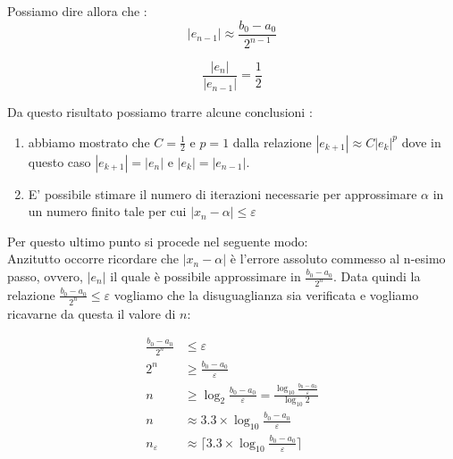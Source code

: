 \documentclass[12pt, a4paper]{book}
\theoremstyle{definition}
\begin{document}
\begin{flushleft}
Possiamo dire allora che : 
\[ 
	|e_{n-1}| \approx \frac{b_{0} - a_{0}}{2^{n-1}} 
\]

\[ 
	\dfrac{|e_{n}| }{|e_{n-1}| } = \frac{1}{2}
\]

Da questo risultato possiamo trarre alcune conclusioni : 
\begin{enumerate}
	\item abbiamo mostrato che $C = \frac{1}{2}$ e $p = 1$ dalla relazione $|e_{k+1}| \approx C|e_{k}|^{p}$ dove in questo caso $|e_{k+1}| = |e_{n}| $ e $|e_{k}| = |e_{n-1}| $.
	\item E' possibile stimare il numero di iterazioni necessarie per approssimare $\alpha$ in un numero finito tale per cui $|x_{n} - \alpha| \leq \varepsilon$
\end{enumerate}

Per questo ultimo punto si procede nel seguente modo:\\
Anzitutto occorre ricordare che $|x_{n} - \alpha|$ è l'errore assoluto commesso al n-esimo passo,  ovvero, $|e_{n}|$ il quale è possibile approssimare in  $ \frac{b_{0} - a_{0}}{2^{n}}$.  Data quindi la relazione $ \frac{b_{0} - a_{0}}{2^{n}} \leq \varepsilon$ vogliamo che la disuguaglianza sia verificata e vogliamo ricavarne da questa il valore di $n$:

\begin{equation}
	\begin{split}
		 \frac{b_{0} - a_{0}}{2^{n}} & \leq \varepsilon \\
		 2^{n} & \geq  \frac{b_{0} - a_{0}}{\varepsilon} \\
		 n & \geq \log_{2}  \frac{b_{0} - a_{0}}{\varepsilon} = \frac{ \log_{10} \frac{b_{0} - a_{0}}{\varepsilon} }{ \log_{10} 2} \\
		 n & \approx 3.3 \times  \log_{10} \frac{b_{0} - a_{0}}{\varepsilon} \\
		 n_{\varepsilon} & \approx \lceil 3.3 \times  \log_{10} \frac{b_{0} - a_{0}}{\varepsilon} \rceil
	\end{split}
\end{equation}
\end{flushleft}
\end{document}
